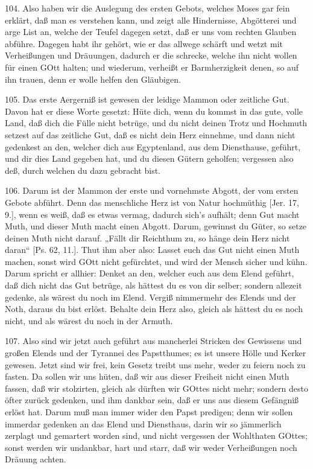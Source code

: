 104. Also haben wir die Auslegung des ersten Gebots, welches Moses gar fein erklärt, daß man es verstehen kann, und zeigt alle Hindernisse, Abgötterei und arge List an, welche der Teufel dagegen setzt, daß er uns vom rechten Glauben abführe. Dagegen habt ihr gehört, wie er das allwege schärft und wetzt mit Verheißungen und Dräuungen, dadurch er die schrecke, welche ihn nicht wollen für einen GOtt halten; und wiederum, verheißt er Barmherzigkeit denen, so auf ihn trauen, denn er wolle helfen den Gläubigen.

105. Das erste Aergerniß ist gewesen der leidige Mammon oder zeitliche Gut. Davon hat er diese Worte gesetzt: Hüte dich, wenn du kommst in das gute, volle Land, daß dich die Fülle nicht betrüge, und du nicht deinen Trotz und Hochmuth setzest auf das zeitliche Gut, daß es nicht dein Herz einnehme, und dann nicht gedenkest an den, welcher dich aus Egyptenland, aus dem Diensthause, geführt, und dir dies Land gegeben hat, und du diesen Gütern geholfen; vergessen also deß, durch welchen du dazu gebracht bist.

106. Darum ist der Mammon der erste und vornehmste Abgott, der vom ersten Gebote abführt. Denn das menschliche Herz ist von Natur hochmüthig [Jer. 17, 9.], wenn es weiß, daß es etwas vermag, dadurch sich’s aufhält; denn
Gut macht Muth, und dieser Muth macht einen Abgott. Darum, gewinnst du Güter, so setze deinen Muth nicht darauf. „Fällt dir Reichthum zu, so hänge dein Herz nicht daran“ [Ps. 62, 11.]. Thut ihm aber also: Lasset euch das Gut nicht einen Muth machen, sonst wird GOtt nicht gefürchtet, und wird der Mensch sicher und kühn. Darum spricht er allhier: Denket an den, welcher euch aus dem Elend geführt, daß dich nicht das Gut betrüge, als hättest du es von dir selber; sondern allezeit gedenke, als wärest du noch im Elend. Vergiß nimmermehr des Elends und der Noth, daraus du bist erlöst. Behalte dein Herz also, gleich als hättest du es noch nicht, und als wärest du noch in der Armuth.

107. Also sind wir jetzt auch geführt aus mancherlei Stricken des Gewissens und großen Elends und der Tyrannei des Papstthumes; es ist unsere Hölle und Kerker gewesen. Jetzt sind wir frei, kein Gesetz treibt uns mehr, weder zu feiern noch zu fasten. Da sollen wir uns hüten, daß wir aus dieser Freiheit nicht einen Muth fassen, daß wir stolzirten, gleich als dürften wir GOttes nicht mehr; sondern desto öfter zurück gedenken, und ihm dankbar sein, daß er uns aus diesem Gefängniß erlöst hat. Darum muß man immer wider den Papst predigen; denn wir sollen immerdar gedenken an das Elend und Diensthaus, darin wir so jämmerlich zerplagt und gemartert worden sind, und nicht vergessen der Wohlthaten GOttes; sonst werden wir undankbar, hart und starr, daß wir weder Verheißungen noch Dräuung achten.

